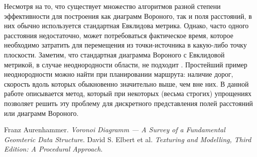 \documentclass[12pt]{article}
\begin{document}
Несмотря на то, что существует множество алгоритмов разной степени эффективности для построения как диаграмм Вороного, так и поля расстояний, в них обычно используется стандартная Евклидова метрика. Однако, часто одного расстояния недостаточно, может потребоваться фактическое время, которое необходимо затратить для перемещения из точки-источника в какую-либо точку плоскости. Заметим, что стандартная диаграмма Вороного с Евклидовой метрикой, в случае неоднородности области, не подходит . Простейший пример неоднородности можно найти при планировании маршрута: наличие дорог, скорость вдоль которых обыкновенно значительно выше, чем вне них. В данной работе описывается метод, который при некоторых (весьма строгих) упрощениях позволяет решить эту проблему для дискретного представления полей расстояний или диаграмм Вороного.

\pagebreak

\begin{thebibliography}{10}
 Franz Aurenhammer. \textit{Voronoi Diagramm --- A Survey of a Fundamental Geomteric Data Structure}.
 David S. Elbert et al. \textit{Texturing and Modelling, Third Edition: A Procedural Approach}.
\end{thebibliography}
\end{document}
